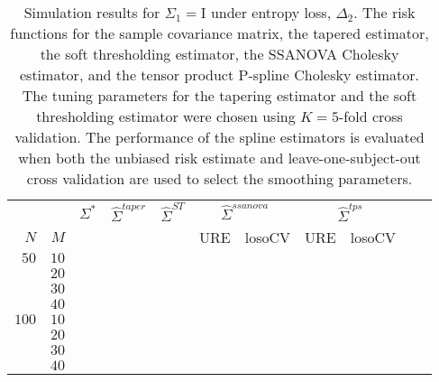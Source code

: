 \documentclass[12pt]{article}
\newcommand{\ra}[1]{\renewcommand{\arraystretch}{#1}}
\theoremstyle{definition}
\begin{document}
\begin{table}\centering
\ra{1.3}
\caption{Simulation results for $\Sigma_1 = \mathrm{I}$ under entropy loss, $\Delta_2$. The risk functions for the sample covariance matrix, the tapered estimator, the soft thresholding estimator, the SSANOVA Cholesky estimator, and the tensor product P-spline Cholesky estimator. The tuning parameters for the tapering estimator and the soft thresholding estimator were chosen using $K = 5$-fold cross validation. The performance of the spline estimators is evaluated when both the unbiased risk estimate and leave-one-subject-out cross validation are used to select the smoothing parameters.}
\begin{tabular}{@{}rrrcrcrrcrr@{}}\toprule
   &            & \multicolumn{1}{c}{$\Sigma^*$}  & \multicolumn{1}{c}{$\hat{\Sigma}^{taper}$} &\multicolumn{1}{c}{$\hat{\Sigma}^{ST}$} &\multicolumn{2}{c}{ $\hat{\Sigma}^{ssanova}$} &  \multicolumn{2}{c}{ $\hat{\Sigma}^{tps}$}\\
$N$ & $M$ 	&	  &	& & \multicolumn{1}{c}{\mbox{URE}} & \multicolumn{1}{c}{\mbox{losoCV}} &\multicolumn{1}{c}{\mbox{URE}} & \multicolumn{1}{c}{\mbox{losoCV}}\\ \midrule
$50$ & $10$\\
  & $20$  &&&&&&&\\
  & $30$   &&&&&&&\\
& $40$   &&&&&&&\\ 
$100$ & $10$ &&&&&&&\\
& $20$  &&&&&&& \\
& $30$  &&&&&&& \\
& $40$  &&&&&&& \\ 
\bottomrule
\end{tabular}
\end{table}

\end{document}
